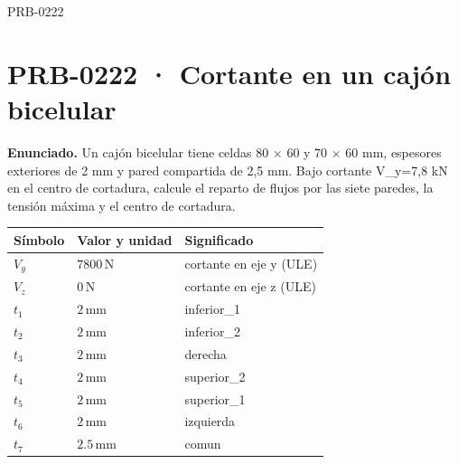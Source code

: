 \Needspace{.3\textheight}

\begin{studiumworked}{PRB-0222}

\section{PRB-0222 · Cortante en un cajón bicelular}

\textbf{Enunciado.} Un cajón bicelular tiene celdas 80 \ensuremath{\times} 60 y 70 \ensuremath{\times} 60 mm, espesores exteriores de 2 mm y pared compartida de 2,5 mm. Bajo cortante V\_y=7,8 kN en el centro de cortadura, calcule el reparto de flujos por las siete paredes, la tensión máxima y el centro de cortadura.

\par\medskip\noindent\begin{tabular}{@{}p{.18\linewidth}p{.26\linewidth}p{.48\linewidth}@{}}
\toprule Símbolo & Valor y unidad & Significado\\\midrule
$V_{y}$ & $7800\,\mathrm{N}$ & cortante en eje y (ULE)\\
$V_{z}$ & $0\,\mathrm{N}$ & cortante en eje z (ULE)\\
$t_{1}$ & $2\,\mathrm{mm}$ & inferior\_1\\
$t_{2}$ & $2\,\mathrm{mm}$ & inferior\_2\\
$t_{3}$ & $2\,\mathrm{mm}$ & derecha\\
$t_{4}$ & $2\,\mathrm{mm}$ & superior\_2\\
$t_{5}$ & $2\,\mathrm{mm}$ & superior\_1\\
$t_{6}$ & $2\,\mathrm{mm}$ & izquierda\\
$t_{7}$ & $2.5\,\mathrm{mm}$ & comun\\
\bottomrule\end{tabular}\par\medskip


\end{studiumworked}
